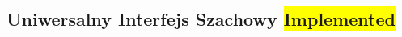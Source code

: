 \subsection{Uniwersalny Interfejs Szachowy \colorbox{yellow}{Implemented}}
\label{subsec:interfejs-szachowy}